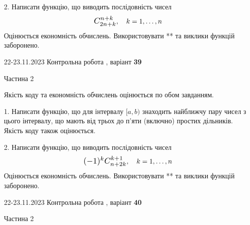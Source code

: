 \documentclass[12pt, ukrainian]{article}
\begin{document}
{{{{{{{{{{\begin {Large}
\vspace{10mm}



2. 
Написати функцію, що виводить послідовність чисел
$$\scalebox{1.2}{$C_{2n+k}^{n+k}$}, \quad k=1,\ldots,n$$
Оцінюється економність обчислень. Використовувати ** та виклики функцій заборонено.

\end{Large}\newpage




\begin {Huge}
{{22-23.11.2023 Контрольна робота , варіант  \No \textbf { 39 }\par}}

\begin{center}Частина 2
\end{center}
\vspace{10mm}
\end {Huge}

{
\begin {Large}
Якість коду та економність обчислень оцінюється по обом завданням.

\vspace{5mm}

1. Написати функцію, що для інтервалу $[a, b)$ знаходить найближчу пару чисел з цього інтервалу, що мають від трьох до п'яти (включно) простих дільників.\\	Якість коду також оцінюється. 



\vspace{10mm}



2. 
Написати функцію, що виводить послідовність чисел
$$\scalebox{1.2}{$(-1)^{k}C_{n+2k}^{k+1}$}, \quad k=1,\ldots,n$$
Оцінюється економність обчислень. Використовувати ** та виклики функцій заборонено.

\end{Large}\newpage




\begin {Huge}
{{22-23.11.2023 Контрольна робота , варіант  \No \textbf { 40 }\par}}

\begin{center}Частина 2
\end{center}
\vspace{10mm}
\end {Huge}

}}}}}}}}}}}
\end{document}
